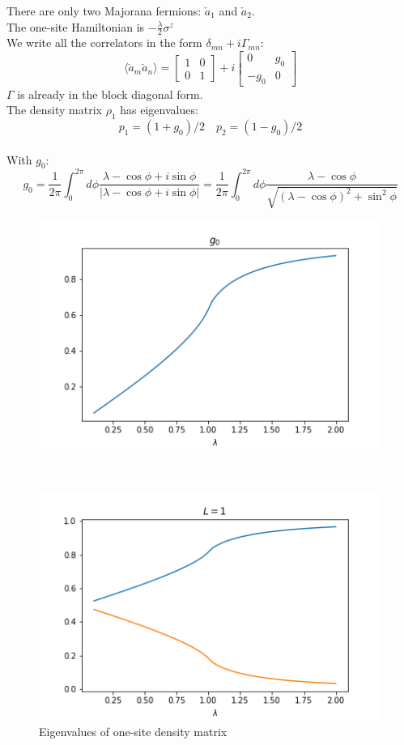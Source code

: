 \documentclass[12pt,a4paper]{report}
\begin{document}
There are only two Majorana fermions: $\check{a}_1$ and $\check{a}_2$.\\
The one-site Hamiltonian is $-\frac{\lambda}{2}\sigma^z$\\
We write all the correlators in the form $\delta_{m n}+i\Gamma_{m n}$:
\begin{equation}
	\langle\check{a}_{m} \check{a}_{n}\rangle= \left[\begin{array}{cc}
		1 & 0 \\
		0 & 1
	\end{array}\right]+i\left[\begin{array}{cc}
		0 & g_0 \\
		-g_0 & 0
	\end{array}\right]
\end{equation}
$\Gamma$ is already in the block diagonal form.\\
The density matrix $\rho_1$ has eigenvalues:
\begin{equation}
	p_1=(1+g_0)/2 \quad p_2=(1-g_0)/2
\end{equation}\\
With $g_0$:
\begin{equation}
	g_0=\frac{1}{2 \pi} \int_{0}^{2 \pi} d \phi \frac{\lambda-\cos \phi+i \sin \phi}{|\lambda-\cos\phi +i  \sin \phi|}=\frac{1}{2 \pi} \int_{0}^{2 \pi} d \phi \frac{\lambda-\cos \phi}{\sqrt{(\lambda-\cos\phi)^2 +  \sin^2 \phi}}
\end{equation}
\begin{figure}[h!]
	\centering
	\includegraphics[width=0.7\linewidth]{g0}
	\caption{}
	\label{fig:g0}
\end{figure}\\
\begin{figure}[h!]
	\centering
	\includegraphics[width=0.7\linewidth]{L1_lambda}
	\caption{Eigenvalues of one-site density matrix}
	\label{fig:l1lambda}
\end{figure}\\
\end{document}
